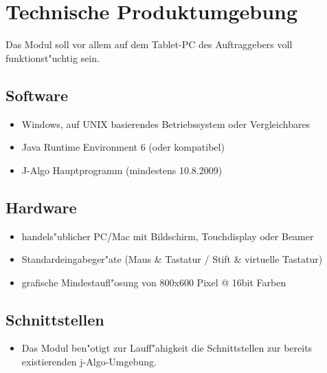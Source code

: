 \section{Technische Produktumgebung}

Das Modul soll vor allem auf dem Tablet-PC des Auftraggebers voll funktionst"uchtig sein.

\subsection{Software}

\begin{itemize}
  \item Windows, auf UNIX basierendes Betriebssystem oder Vergleichbares
	\item Java Runtime Environment 6 (oder kompatibel)
  \item J-Algo Hauptprogramm (mindestens 10.8.2009)
\end{itemize}

\subsection{Hardware}

\begin{itemize}
  \item handels"ublicher PC/Mac mit Bildschirm, Touchdisplay oder Beamer
  
  \item Standardeingabeger"ate (Maus \& Tastatur / Stift \& virtuelle Tastatur)
  \item grafische Mindestaufl"osung von 800x600 Pixel @ 16bit Farben
\end{itemize}

\subsection{Schnittstellen}

\begin{itemize}
  \item Das Modul ben"otigt zur Lauff"ahigkeit die Schnittstellen zur bereits existierenden
  j-Algo-Umgebung.
\end{itemize}
